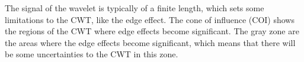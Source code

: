 The signal of the wavelet is typically of a finite length, which sets some limitations to the CWT, like the edge effect. The cone of influence (COI) shows the regions of the CWT where edge effects become significant. The gray zone are the areas where the edge effects become significant, which means that there will be some uncertainties to the CWT in this zone. \cite{mathworks2017}


